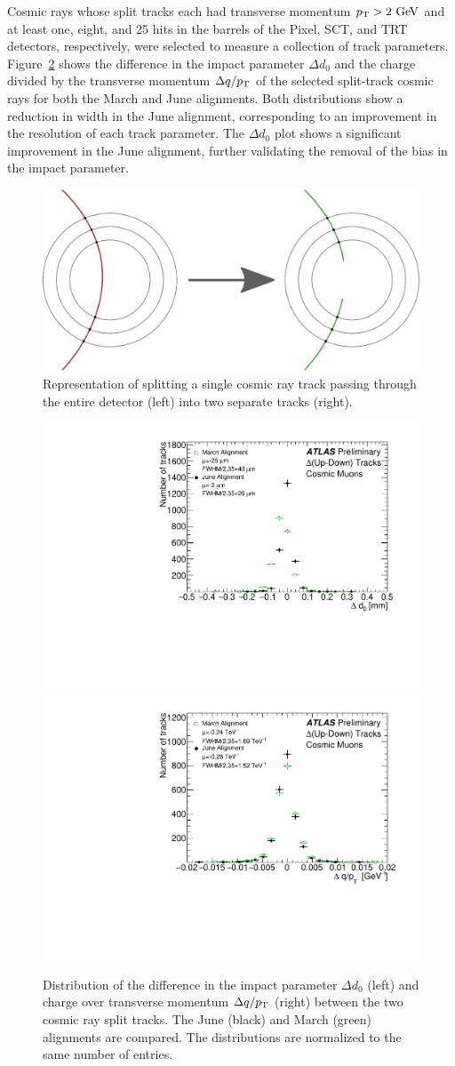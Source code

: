 Cosmic rays whose split tracks each had transverse momentum $\pt > 2\gev$ and at least one, eight, and 25 hits in the barrels of the Pixel, SCT, and TRT detectors, respectively, were selected to measure a collection of track parameters.
Figure~\ref{fig:align_2015_results_cosmic} shows the difference in the impact parameter $\Delta d_0$ and the charge divided by the transverse momentum $\Delta q/p_{\mathrm{T}}$ of the selected split-track cosmic rays for both the March and June alignments.
Both distributions show a reduction in width in the June alignment, corresponding to an improvement in the resolution of each track parameter. 
The $\Delta d_0$ plot shows a significant improvement in the June alignment, further validating the removal of the bias in the impact parameter.

\begin{figure}[htbp]
  \centering
  \includegraphics[width=.6\textwidth]{figs/alignment/split-track}
  \caption{Representation of splitting a single cosmic ray track passing through the entire detector (left) into two separate tracks (right).}
  \label{fig:align_2015_results_split_track}
\end{figure}

\begin{figure}[htbp]
  \centering
  \includegraphics[width=.48\textwidth]{figs/alignment/align2015/DELTAD0}
  \includegraphics[width=.48\textwidth]{figs/alignment/align2015/DELTAQOPT}
  \caption{Distribution of the difference in the impact parameter $\Delta d_0$ (left) and charge over transverse momentum $\Delta q/p_{\mathrm{T}}$ (right) between the two cosmic ray split tracks.  The June (black) and March (green) alignments are compared.  The distributions are normalized to the same number of entries.}
  \label{fig:align_2015_results_cosmic}
\end{figure}

